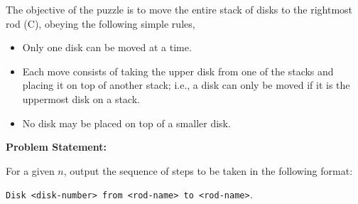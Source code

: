 The objective of the puzzle is to move the entire stack of disks to the
rightmost rod (C), obeying the following simple rules,
\begin{itemize}
	\item Only one disk can be moved at a time.
	\item Each move consists of taking the upper disk from one of the stacks and placing it on top of another stack; i.e., a disk can only be moved if it is the uppermost disk on a stack.
	\item No disk may be placed on top of a smaller disk.
\end{itemize}
\textbf{Problem Statement:}

For a given $n$, output the sequence of steps to be taken in the following format:

\verb!Disk <disk-number> from <rod-name> to <rod-name>!.

